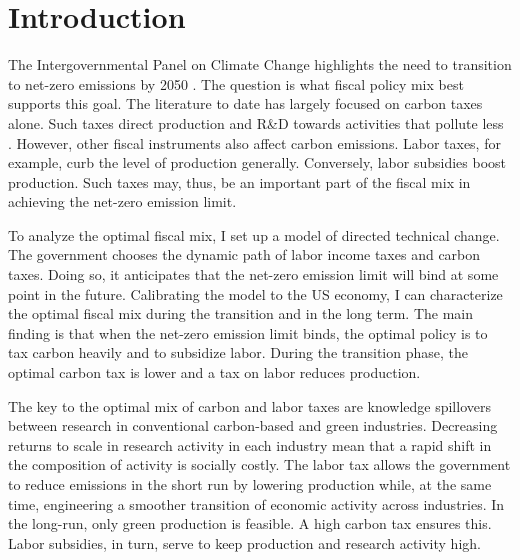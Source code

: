 \thispagestyle{empty}
\clearpage
\setcounter{page}{1}
\section{Introduction}




The Intergovernmental Panel on Climate Change highlights the need to transition to net-zero emissions by 2050 \citep{IPCC2022}. The question is what fiscal policy mix best supports this goal. The literature to date has largely focused on carbon taxes alone. Such taxes direct production and R\&D towards activities that pollute less \citep{Acemoglu2012TheChange}. However, other fiscal instruments also affect carbon emissions. Labor taxes, for example, curb the level of production generally. Conversely, labor subsidies  boost production. Such taxes may, thus, be an important part of the fiscal mix in achieving the  net-zero emission limit.

To analyze the optimal fiscal mix, I set up a model of directed technical change. The government chooses the dynamic path of labor income taxes and carbon taxes. Doing so, it anticipates that the net-zero emission limit will bind at some point in the future. Calibrating the model to the US economy, I can characterize the optimal fiscal mix during the transition and in the long term. The main finding is that when the net-zero emission limit binds, the optimal policy is to tax carbon heavily and to subsidize labor. During the transition phase, the optimal carbon tax is lower and a tax on labor reduces production. 

The key to the optimal mix of carbon and labor taxes are knowledge spillovers between research in conventional carbon-based and green industries. Decreasing returns to scale in research activity in each industry mean that a rapid shift in the composition of activity is socially costly. The labor tax allows the government to reduce emissions in the short run by  lowering production while, at the same time, engineering a smoother transition of economic activity across industries. In the long-run, only green production is feasible. A high carbon tax ensures this. Labor subsidies, in turn, serve to keep production and research activity high.

